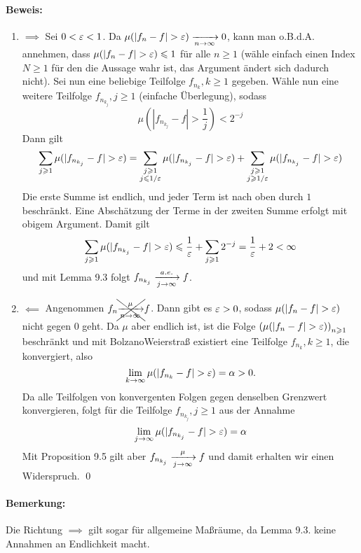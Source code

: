 \paragraph{Beweis:}
\begin{enumerate}[label=\Roman*.]
    \item $\implies$\newline
    Sei $0<\varepsilon<1$. Da $\mu(|f_n-f|>\eps)\nto{}{n\to\infty}0$, kann man o.B.d.A. annehmen, dass $\mu(|f_n-f|>\eps)\leq1$ f\"ur alle $n\geq1$ (w\"ahle einfach einen Index $N\geq1$ f\"ur den die Aussage wahr ist, das Argument \"andert sich dadurch nicht). Sei nun eine beliebige Teilfolge $f_{n_k},k\geq1$ gegeben. W\"ahle nun eine weitere Teilfolge $f_{n_{k_j}},j\geq1$ (einfache \"Uberlegung), sodass 
    $$\mu\left(|f_{n_{k_j}}-f|>\dfrac{1}{j}\right)<2^{-j}$$
    Dann gilt 
    $$\sum_{j\geq1}\mu(|f_{n_{k_j}}-f|>\eps)=\sum_{\substack{j\geq1\\ j\leq 1/\eps}}\mu(|f_{n_{k_j}}-f|>\eps)+\sum_{\substack{j\geq1\\ j\geq 1/\eps}}\mu(|f_{n_{k_j}}-f|>\eps)$$
    Die erste Summe ist endlich, und jeder Term ist nach oben durch $1$ beschr\"ankt. Eine Absch\"atzung der Terme in der zweiten Summe erfolgt mit obigem Argument.
    Damit gilt
    $$\sum_{j\geq1}\mu(|f_{n_{k_j}}-f|>\eps)\leq\dfrac{1}{\eps}+\sum_{j\geq1}2^{-j}=\dfrac{1}{\eps}+2<\infty$$
    und mit Lemma 9.3 folgt $f_{n_{k_j}}\nto{a.e.}{j\to\infty}f$.
    \item $\impliedby$\newline
    Angenommen $f_n\xcancel{\nto{\mu}{n\to\infty}}f$. Dann gibt es $\varepsilon>0$, sodass $\mu(|f_n-f|>\eps)$ nicht gegen $0$ geht. Da $\mu$ aber endlich ist, ist die Folge $\left(\mu(|f_n-f|>\eps)\right)_{n\geq1}$ beschr\"ankt  und mit Bolzano\textendash Weierstra\ss{} existiert eine Teilfolge $f_{n_k},k\geq1$, die konvergiert, also 
    $$\lim_{k\to\infty}\mu(|f_{n_k}-f|>\eps)=\alpha>0.$$ 
    Da alle Teilfolgen von konvergenten Folgen gegen denselben Grenzwert konvergieren, folgt f\"ur die Teilfolge $f_{n_{k_j}},j\geq1$ aus der Annahme
    $$\lim_{j\to\infty}\mu(|f_{n_{k_j}}-f|>\eps)=\alpha$$
    Mit Proposition 9.5 gilt aber $f_{n_{k_j}}\nto{\mu}{j\to\infty}f$ und damit erhalten wir einen Widerspruch. \qed
\end{enumerate}

\paragraph{Bemerkung:}Die Richtung $\implies$ gilt sogar f\"ur allgemeine Ma\ss{}r\"aume, da Lemma 9.3. keine Annahmen an Endlichkeit macht.  

